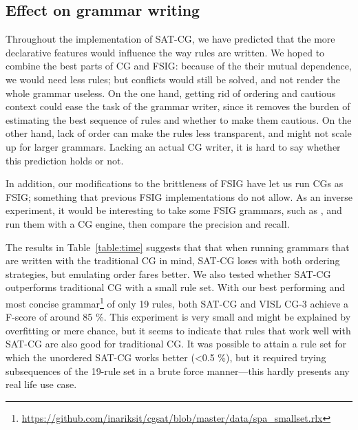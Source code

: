 \subsection{Effect on grammar writing}

Throughout the implementation of SAT-CG, we have predicted that the more declarative features would influence the way rules are written. 
We hoped to combine the best parts of CG and FSIG: because of the their mutual dependence, we would need less rules;
but conflicts would still be solved, and not render the whole grammar useless.
On the one hand, getting rid of ordering and cautious context could ease the task of the grammar writer, since it removes the burden of estimating the best sequence of rules and whether to make them cautious. On the other hand, lack of order can make the rules less transparent, and might not scale up for larger grammars.
Lacking an actual CG writer, it is hard to say whether this prediction holds or not.

In addition, our modifications to the brittleness of FSIG have let us run CGs as FSIG; something that previous FSIG implementations do not allow.
As an inverse experiment, it would be interesting to take some FSIG grammars, such as \cite{voutilainen1997fsig}, and run them with a CG engine, then compare the precision and recall. 


The results in Table~\ref{table:time} suggests that that when running grammars that are written
with the traditional CG in mind, SAT-CG loses with both ordering
strategies, but emulating order fares better.
We also tested whether SAT-CG outperforms traditional CG with a
small rule set. With our best performing and most concise
grammar\footnote{\url{https://github.com/inariksit/cgsat/blob/master/data/spa\_smallset.rlx}}
of only 19 rules, both SAT-CG and VISL CG-3  achieve a F-score of
around 85 \%. This experiment is very small and might be explained by
overfitting or mere chance, but it seems to indicate that rules that
work well with SAT-CG are also good for traditional CG.
It was possible to attain a rule set for which the unordered SAT-CG
works better (\textless0.5 \%), but it required trying
subsequences of the 19-rule set in a brute force manner---this hardly
presents any real life use case.



